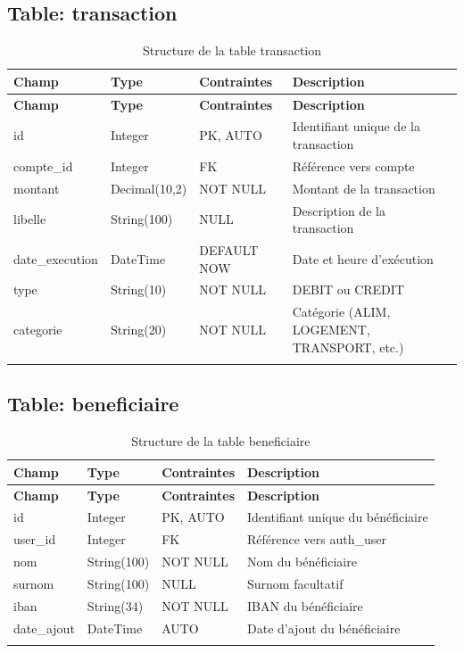 \documentclass[12pt,a4paper]{report}
\begin{document}
\subsection{Table: transaction}
\begin{longtable}{|p{3.5cm}|p{2.5cm}|p{2cm}|p{6cm}|}
\hline
\rowcolor{banquiseblue!30}
\textbf{Champ} & \textbf{Type} & \textbf{Contraintes} & \textbf{Description} \\
\hline
\endfirsthead
\hline
\rowcolor{banquiseblue!30}
\textbf{Champ} & \textbf{Type} & \textbf{Contraintes} & \textbf{Description} \\
\hline
\endhead

id & Integer & PK, AUTO & Identifiant unique de la transaction \\
\hline
compte\_id & Integer & FK & Référence vers compte \\
\hline
montant & Decimal(10,2) & NOT NULL & Montant de la transaction \\
\hline
libelle & String(100) & NULL & Description de la transaction \\
\hline
date\_execution & DateTime & DEFAULT NOW & Date et heure d'exécution \\
\hline
type & String(10) & NOT NULL & DEBIT ou CREDIT \\
\hline
categorie & String(20) & NOT NULL & Catégorie (ALIM, LOGEMENT, TRANSPORT, etc.) \\
\hline

\caption{Structure de la table transaction}
\end{longtable}

\subsection{Table: beneficiaire}
\begin{longtable}{|p{3.5cm}|p{2.5cm}|p{2cm}|p{6cm}|}
\hline
\rowcolor{banquiseblue!30}
\textbf{Champ} & \textbf{Type} & \textbf{Contraintes} & \textbf{Description} \\
\hline
\endfirsthead
\hline
\rowcolor{banquiseblue!30}
\textbf{Champ} & \textbf{Type} & \textbf{Contraintes} & \textbf{Description} \\
\hline
\endhead

id & Integer & PK, AUTO & Identifiant unique du bénéficiaire \\
\hline
user\_id & Integer & FK & Référence vers auth\_user \\
\hline
nom & String(100) & NOT NULL & Nom du bénéficiaire \\
\hline
surnom & String(100) & NULL & Surnom facultatif \\
\hline
iban & String(34) & NOT NULL & IBAN du bénéficiaire \\
\hline
date\_ajout & DateTime & AUTO & Date d'ajout du bénéficiaire \\
\hline

\caption{Structure de la table beneficiaire}
\end{longtable}
\end{document}
